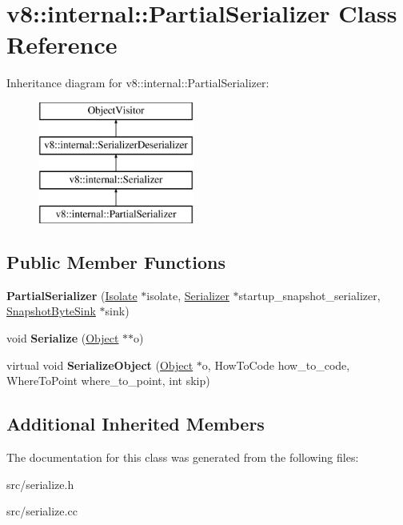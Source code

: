 \hypertarget{classv8_1_1internal_1_1_partial_serializer}{}\section{v8\+:\+:internal\+:\+:Partial\+Serializer Class Reference}
\label{classv8_1_1internal_1_1_partial_serializer}
Inheritance diagram for v8\+:\+:internal\+:\+:Partial\+Serializer\+:\begin{figure}[H]
\begin{center}
\leavevmode
\includegraphics[height=4.000000cm]{classv8_1_1internal_1_1_partial_serializer}
\end{center}
\end{figure}
\subsection*{Public Member Functions}
\begin{DoxyCompactItemize}
\item 
\hypertarget{classv8_1_1internal_1_1_partial_serializer_a80742cc5e60ae1edd95cc20c64685364}{}{\bfseries Partial\+Serializer} (\hyperlink{classv8_1_1internal_1_1_isolate}{Isolate} $\ast$isolate, \hyperlink{classv8_1_1internal_1_1_serializer}{Serializer} $\ast$startup\+\_\+snapshot\+\_\+serializer, \hyperlink{classv8_1_1internal_1_1_snapshot_byte_sink}{Snapshot\+Byte\+Sink} $\ast$sink)\label{classv8_1_1internal_1_1_partial_serializer_a80742cc5e60ae1edd95cc20c64685364}

\item 
\hypertarget{classv8_1_1internal_1_1_partial_serializer_a2bab2ee122ae1fd8049116828dfaae5b}{}void {\bfseries Serialize} (\hyperlink{classv8_1_1internal_1_1_object}{Object} $\ast$$\ast$o)\label{classv8_1_1internal_1_1_partial_serializer_a2bab2ee122ae1fd8049116828dfaae5b}

\item 
\hypertarget{classv8_1_1internal_1_1_partial_serializer_a87d318b3059214e820fb2a95137325f1}{}virtual void {\bfseries Serialize\+Object} (\hyperlink{classv8_1_1internal_1_1_object}{Object} $\ast$o, How\+To\+Code how\+\_\+to\+\_\+code, Where\+To\+Point where\+\_\+to\+\_\+point, int skip)\label{classv8_1_1internal_1_1_partial_serializer_a87d318b3059214e820fb2a95137325f1}

\end{DoxyCompactItemize}
\subsection*{Additional Inherited Members}


The documentation for this class was generated from the following files\+:\begin{DoxyCompactItemize}
\item 
src/serialize.\+h\item 
src/serialize.\+cc\end{DoxyCompactItemize}
